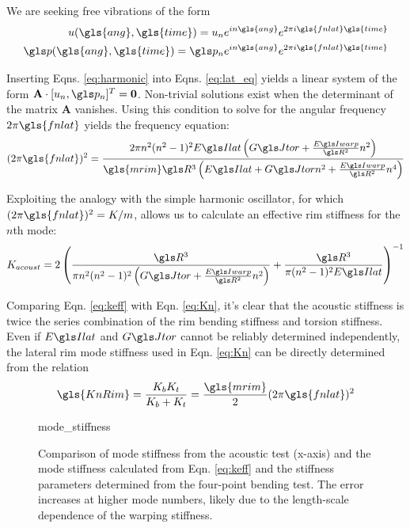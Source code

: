 \documentclass[../thesis.tex]{subfiles}
\begin{document}
We are seeking free vibrations of the form
\begin{subequations}\label{eq:harmonic}
\begin{align}
u(\gls{ang}, \gls{time})=u_n e^{in\gls{ang}}e^{2\pi i \gls{fnlat} \gls{time}}\\
\p(\gls{ang}, \gls{time})=\p_n e^{in\gls{ang}}e^{2\pi i \gls{fnlat} \gls{time}}
\end{align}
\end{subequations}

Inserting Eqns. \eqref{eq:harmonic} into Eqns. \eqref{eq:lat_eq} yields a linear system of the form $\mathbf{A}\cdot [u_n, \p_n]^T=\mathbf{0}$. Non-trivial solutions exist when the determinant of the matrix $\mathbf{A}$ vanishes. Using this condition to solve for the angular frequency $2\pi \gls{fnlat}$ yields the frequency equation:
\begin{equation}\label{eq:lat_freq_eq}
(2\pi \gls{fnlat})^2 = \frac{2\pi n^2(n^2-1)^2\EIl\left(\GJ + \frac{\EIw}{\R^2}n^2 \right)}
                {\gls{mrim} \R^3 \left( \EIl + \GJ n^2 + \frac{\EIw}{\R^2}n^4\right)}
\end{equation}

Exploiting the analogy with the simple harmonic oscillator, for which $(2\pi \gls{fnlat})^2=K/m$, allows us to calculate an effective rim stiffness for the $n$th mode:
\begin{equation}\label{eq:keff}
K_{acoust} = 2 \left( \frac{\R^3}{\pi n^2(n^2-1)^2\left( \GJ + \frac{\EIw}{\R^2}n^2\right)} +
  \frac{\R^3}{\pi(n^2-1)^2\EIl} \right)^{-1}
\end{equation}

Comparing Eqn. \eqref{eq:keff} with Eqn. \eqref{eq:Kn}, it's clear that the acoustic stiffness is twice the series combination of the rim bending stiffness and torsion stiffness. Even if $\EIl$ and $\GJ$ cannot be reliably determined independently, the lateral rim mode stiffness used in Eqn. \eqref{eq:Kn} can be directly determined from the relation
\begin{equation}
\gls{KnRim} = \frac{\Kbend\Ktors}{\Kbend + \Ktors} = \frac{\gls{mrim}}{2}(2\pi\gls{fnlat})^2
\end{equation}

\begin{figure}
  {mode_stiffness}
  \caption{Comparison of mode stiffness from the acoustic test (x-axis) and the mode stiffness calculated from Eqn. \eqref{eq:keff} and the stiffness parameters determined from the four-point bending test. The error increases at higher mode numbers, likely due to the length-scale dependence of the warping stiffness.}
  \label{fig:keff}
\end{figure}
\end{document}

